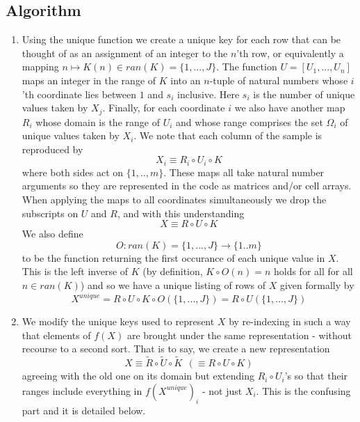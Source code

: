 \documentclass[11pt]{article}
\begin{document}
\subsection{Algorithm}
\begin{enumerate}
\item
Using the unique function we create a unique key for each row that can be thought of as an assignment of an integer to the $n$'th row, or equivalently a mapping $n \mapsto K(n) \in ran(K) = \{1,...,J\}$. The function $U=[U_1,...,U_n]$ maps an integer in the range of $K$ into an $n$-tuple of natural numbers whose $i$'th coordinate lies between $1$ and $s_i$ inclusive. Here $s_i$ is the number of unique values taken by $X_j$.  Finally, for each coordinate $i$ we also have another map $R_i$ whose domain is the range of $U_i$ and whose range comprises the set $\Omega_i$ of unique values taken by $X_i$.  We note that each column of the sample is reproduced by
$$
    X_i  \equiv  R_i \circ U_i \circ K
$$
where both sides act on $\{1,..,m\}$. These maps all take natural number arguments so they are represented in the code as matrices and/or cell arrays. When applying the maps to all coordinates simultaneously we drop the subscripts on $U$ and $R$, and with this understanding 
$$
 X \equiv R \circ U \circ K
$$ 
We also define $$
O : ran(K)=\{1,...,J\} \rightarrow \{1..m\}$$
 to be the function returning the first occurance of each unique value in $X$. This is the left inverse of $K$ (by definition, $K \circ O (n) = n$  holds for all for all $n \in ran(K)$) and so we have a unique listing of rows of $X$ given formally by 
$$ 
  X^{unique} = R \circ U \circ K \circ O ( \{1,...,J\}) = R \circ U ( \{1,...,J\})
$$
\item
We modify the unique keys used to represent $X$ by re-indexing in such a way that elements of $f(X)$ are brought under the same representation - without recourse to a second sort. That is to say, we create a new representation
$$
      X \equiv  \tilde{R} \circ \tilde{U} \circ \tilde{K}  \ \  \left ( \equiv R \circ U \circ K \right)
$$
agreeing with the old one on its domain but extending $R_i \circ U_i$'s so that their ranges include everything in $f(X^{unique})_i$ - not just $X_i$. This is the confusing part and it is detailed below. 
\end{enumerate}
\end{document}
